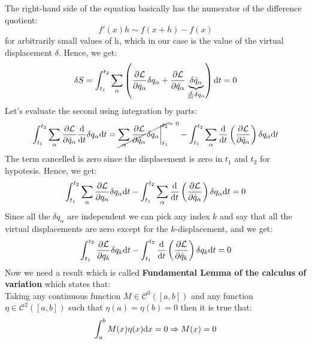 The right-hand side of the equation basically has the numerator of the difference quotient:
\begin{equation}
    f'(x)h \sim f(x+h) - f(x)
\end{equation}
for arbitrarily small values of h, which in our case is the value of the virtual displacement $\delta$. Hence, we get:
\begin{equation}
    \delta S = \int_{t_1}^{t_2}\displaystyle\sum_{\alpha}\left(\dfrac{\partial \mathcal{L}}{\partial q_{\alpha}}\delta q_{\alpha} + \dfrac{\partial \mathcal{L}}{\partial \dot{q}_{\alpha}} \underbrace{\delta \dot{q}_{\alpha}}_{\frac{\mathrm{d}}{\mathrm{d}t}\delta q_{\alpha}}\right) \mathrm{d}t = 0
\end{equation}
Let's evaluate the second using integration by parts:
\begin{equation}
    \int_{t_1}^{t_2}\bigsum_{\alpha}\partialD{\lagr}{\dot{q}_{\alpha}} \totalD{}{t}\delta q_{\alpha} \diff{t} = \crossout{\bigsum_{\alpha}\partialD{\lagr}{\dot{q}_{\alpha}} \delta q_{\alpha}\bigg|_{t_1}^{t_2}} - \int_{t_1}^{t_2}\bigsum_{\alpha}\totalD{}{t}\brackets{\partialD{\lagr}{\dot{q}_{\alpha}}} \delta q_{\alpha} \diff{t}
\end{equation}
The term cancelled is zero since the displacement is zero in $t_1$ and $t_2$ for hypotesis. Hence, we get:
\begin{equation}
    \int_{t_1}^{t_2}\displaystyle\sum_{\alpha}\dfrac{\partial \mathcal{L}}{\partial q_{\alpha}}\delta q_{\alpha} \mathrm{d}t - \int_{t_1}^{t_2}\displaystyle\sum_{\alpha}\dfrac{\mathrm{d} }{\mathrm{d}t}\left(\dfrac{\partial \mathcal{L}}{\partial \dot{q}_{\alpha}}\right) \delta q_{\alpha} \mathrm{d}t = 0
\end{equation}
Since all the $\delta q_{\alpha}$ are independent we can pick any index $k$ and say that all the virtual displacements are zero except for the $k$-displacement, and we get:
\begin{equation}
    \int_{t_1}^{t_2}\dfrac{\partial \mathcal{L}}{\partial q_{k}}\delta q_{k} \mathrm{d}t - \int_{t_1}^{t_2}\dfrac{\mathrm{d} }{\mathrm{d}t}\left(\dfrac{\partial \mathcal{L}}{\partial \dot{q}_{k}}\right) \delta q_{k} \mathrm{d}t = 0
\end{equation}
Now we need a result which is called \textbf{Fundamental Lemma of the calculus of variation} which states that:\\
Taking any continuous function $M\in\mathcal{C}^0([a,b])$ and any function $\eta \in \mathcal{C}^2([a,b])$ such that $\eta(a) = \eta(b) = 0$ then it is true that:
\begin{equation} \label{e:Fundamental_lemma_variation_calculus}
    \int_{a}^{b}M(x)\eta(x)\mathrm{d}x = 0 \Rightarrow M(x) = 0
\end{equation}
